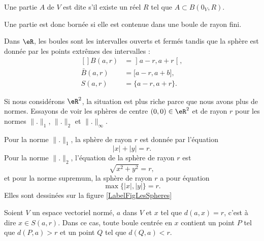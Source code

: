 \begin{definition}
	Une partie $A$ de $V$ est dite  s'il existe un réel $R$ tel que $A\subset B(0_V,R)$.
\end{definition}
Une partie est donc bornée si elle est contenue dans une boule de rayon fini.

\begin{example}
	Dans $\eR$, les boules sont  les intervalles ouverts et fermés tandis que la sphère est donnée par les points extrêmes des intervalles :
	\begin{equation}
		\begin{aligned}[]
			B(a,r)&=\mathopen] a-r , a+r \mathclose[,\\
			\bar B(a,r)&=\mathopen[ a-r , a+b \mathclose],\\
			S(a,r)&=\{ a-r,a+r \}.
		\end{aligned}
	\end{equation}
\end{example}

\begin{example}
	Si nous considérons $\eR^2$, la situation est plus riche parce que nous avons plus de normes. Essayons de voir les sphères de centre $(0,0)\in\eR^2$ et de rayon $r$ pour les normes $\| . \|_1$, $\| . \|_2$ et $\| . \|_{\infty}$.

	Pour la norme $\| . \|_1$, la sphère de rayon $r$ est donnée par l'équation
	\begin{equation}
		| x |+| y |=r.
	\end{equation}
	Pour la norme $\| . \|_2$, l'équation de la sphère de rayon $r$ est
	\begin{equation}
		\sqrt{x^2+y^2}=r,
	\end{equation}
	et pour la norme supremum, la sphère de rayon $r$ a pour équation
	\begin{equation}
		\max\{ | x |,| y | \}=r.
	\end{equation}
	Elles sont dessinées sur la figure \ref{LabelFigLesSpheres}
\newcommand{\CaptionFigLesSpheres}{Les sphères de rayon $1$ pour les trois normes classiques.}

\end{example}

\newcommand{\CaptionFigBoulePtLoin}{Le point $P$ est un peu plus loin que $x$, en suivant la même droite.}


\begin{proposition}		\label{PropBoitPtLoin}
	Soient $V$ un espace vectoriel normé, $a$ dans $V$ et $x$ tel que $d(a,x)=r$, c'est à dire $x\in S(a,r)$. Dans ce cas, toute boule centrée en $x$ contient un point $P$ tel que $d(P,a)>r$ et un point $Q$ tel que $d(Q,a)<r$.
\end{proposition}

